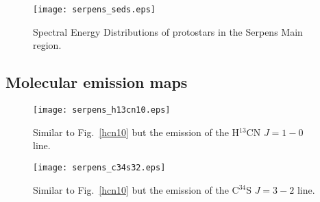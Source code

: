 \documentclass{aa}
\begin{document}
\begin{appendix}
\begin{figure}
   \texttt{[image: serpens\_seds.eps]}
      \caption{Spectral Energy Distributions of protostars in the Serpens Main region.}
         \label{seds}
   \end{figure}

\end{appendix}

\begin{appendix} %
\section{Molecular emission maps}

\begin{figure}
\texttt{[image: serpens\_h13cn10.eps]}
\caption{Similar to Fig.~\ref{hcn10} but the emission of the H$^{13}$CN $J=1-0$ line.}
\label{h13cn10}
\end{figure}


\begin{figure}
\texttt{[image: serpens\_c34s32.eps]}
\caption{Similar to Fig.~\ref{hcn10} but the emission of the C$^{34}$S $J=3-2$ line.}
\label{c34s32}
\end{figure}

\end{appendix}
\end{document}
